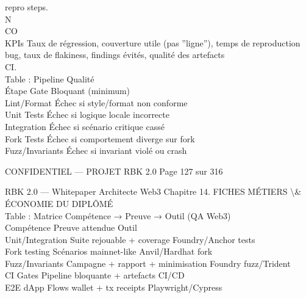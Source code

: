 repro steps.\\
N\\
CO\\
KPIs Taux de régression, couverture utile (pas ”ligne”), temps de reproduction bug, taux de flakiness, findings évités, qualité des artefacts\\
CI.\\
Table : Pipeline Qualité\\
Étape           Gate Bloquant (minimum)\\
Lint/Format     Échec si style/format non conforme\\
Unit Tests      Échec si logique locale incorrecte\\
Integration     Échec si scénario critique cassé\\
Fork Tests      Échec si comportement diverge sur fork\\
Fuzz/Invariants Échec si invariant violé ou crash\\
\vspace{0.5em}
\vspace{0.5em}
\begin{confidential}CONFIDENTIEL — PROJET RBK 2.0                                  Page 127 sur 316\end{confidential}
RBK 2.0 — Whitepaper Architecte Web3                                                Chapitre 14. FICHES MÉTIERS \textbackslash{}& ÉCONOMIE DU DIPLÔMÉ\\
\vspace{0.5em}
\vspace{0.5em}
Table : Matrice Compétence → Preuve → Outil (QA Web3)\\
\vspace{0.5em}
Compétence       Preuve attendue                  Outil\\
Unit/Integration Suite rejouable + coverage       Foundry/Anchor tests\\
Fork testing     Scénarios mainnet-like           Anvil/Hardhat fork\\
Fuzz/Invariants Campagne + rapport + minimisation Foundry fuzz/Trident\\
CI Gates         Pipeline bloquante + artefacts   CI/CD\\
E2E dApp         Flows wallet + tx receipts       Playwright/Cypress\\
\vspace{0.5em}
\vspace{0.5em}
\vspace{0.5em}
